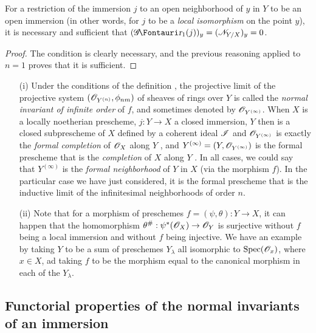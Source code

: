 \begin{corollary}[16.1.10]
\label{IV.16.1.10}
For a restriction of the immersion $j$ to an open neighborhood of $y$ in $Y$ to be an open immersion (in other words, for $j$ to be a \emph{local isomorphism} on the point $y$), it is necessary and sufficient that $(\shGr_1(j))_y = (\sh{N}_{Y/X})_y = 0$.
\end{corollary}

\begin{proof}
The condition is clearly necessary, and the previous reasoning applied to $n=1$ proves that it is sufficient.
\end{proof}

\begin{remark}[16.1.11]
\label{IV.16.1.11}
\begin{enumerate}
  \item[(i)] Under the conditions of the definition , the projective limit of the projective system $(\mathscr{O}_{Y^{(n)}}, \phi_{nm})$ of sheaves of rings over $Y$ is called the \emph{normal invariant of infinite order} of $f$, and sometimes denoted by $\mathscr{O}_{Y^{(\infty)}}$.
  When $X$ is a locally noetherian prescheme, $j:Y \to X$ a closed immersion, $Y$ then is a closed subprescheme of $X$ defined by a coherent ideal $\mathscr{I}$ and $\mathscr{O}_{Y^{(\infty)}}$ is exactly the \emph{formal completion} of $\mathscr{O}_X$ along $Y$ , and $Y^{(\infty)} = (Y, \mathscr{O}_{Y^{(\infty)}})$ is the formal prescheme that is the \emph{completion} of $X$ along $Y$ .
  In all cases, we could say that $Y^{(\infty)}$ is the \emph{formal neighborhood} of $Y$ in $X$ (via the morphism $f$).
  In the particular case we have just considered, it is the formal prescheme that is the inductive limit of the infinitesimal neighborhoods of order $n$.
  \item[(ii)] Note that for a morphism of preschemes $f=(\psi, \theta): Y \to X$, it can happen that the homomorphism $\theta^\#:\psi^*(\sh{O}_X) \to \sh{O}_Y$ is surjective without $f$ being a local 
  immersion and without $f$ being injective.
  We have an example by taking $Y$ to be a sum of preschemes $Y_\lambda$ all isomorphic to $\operatorname{Spec}(\mathscr{O}_x)$, where $x \in X$, ad taking $f$ to be the morphism equal to the canonical morphism in each of the $Y_\lambda$.
\end{enumerate}
\end{remark}

\subsection{Functorial properties of the normal invariants of an immersion}
\label{IV.16.2}

